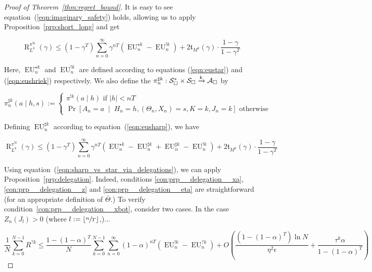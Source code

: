 \documentclass[anon,12pt]{colt2018} %
\newcommand{\Comment}[1]{}
\newcommand{\AP}[1]{\left(#1\right)}
\newcommand{\ABM}[2]{\left[#1\;\middle\vert\;#2\right]}
\newcommand{\CP}[3]{\underset{#1}{\operatorname{Pr}}\ABM{#2}{#3}}
\newcommand{\Reals}{\mathbb{R}}
\newcommand{\Abs}[1]{\left\vert #1 \right\vert}
\newcommand{\Floor}[1]{\left\lfloor #1 \right\rfloor}
\newcommand{\K}{\xrightarrow{\textnormal{k}}}
\newcommand{\A}{\mathcal{A}}
\newcommand{\St}{\mathcal{S}}
\newcommand{\EU}{\operatorname{EU}}
\newcommand{\Rg}{\operatorname{R}}
\newcommand{\Tn}{\mathfrak{t}}
\newcommand{\Ad}{\upsilon}
\newcommand{\PoS}{:\St_\square^* \times \St_\square \K \A_\square}
\newcommand{\IP}{\pi^{!k}}
\begin{document}
\begin{proof}[Proof of Theorem~\ref{thm:regret_bound}]
\Comment{...we define $\alpha_{\Ad\pi}: \St_\square^* \K \St^*$ by

$$\alpha_{\sigma\pi} (g \mid h) := [[h = \underline{g}]]C_h\prod_{n = 0}^{\Abs{h}-1} \sum_{a \in \A}\left([[g_n \in \bot a?]] \pi\left(\bot \mid g_{:n}\right)\sigma\left(a \mid h_{:n}\right)+[[g_n \in a\bot?]]\pi\left(a \mid g_{:n}\right)\right)$$

Here, $C_h \in \Reals$ is a constant defined s.t. the probabilities sum to 1. We define the $?$-policy $\left[\sigma\right]\underline{\pi}$ by

$$\left[\sigma\right]\underline{\pi}(a \mid h):=\Pr_{g \sim \alpha_{\sigma\pi}(h)}\left[\pi\left(g\right)=a \lor \left(\pi\left(g\right)=\bot \land \sigma(h)=a\right)\right]$$}

It is easy to see equation~(\ref{eqn:imaginary_safety}) holds, allowing us to apply Proposition~\ref{prp:short_long} and get

\[\Rg_{L^k}^{\IP}(\gamma) \leq \AP{1-\gamma^T}\sum_{n=0}^\infty \gamma^{nT}\AP{\EU^{\star k}_n-\EU^{!k}_n}+2\Tn_{M^k}(\gamma)\cdot\frac{1-\gamma}{1-\gamma^T}\]

Here, $\EU^{\star k}_n$ and $\EU^{!k}_n$ are defined according to equations (\ref{eqn:eustar}) and (\ref{eqn:eushriek}) respectively. We also define the $\pi^{\sharp k}_n\PoS$ by

$$\pi^{\sharp k}_n(a \mid h,s):=\begin{cases} \pi^{!k}(a \mid h) \text{ if } \Abs{h} < nT \\ \CP{}{A_n=a}{H_n=h,\AP{\Theta_n,X_n}=s,K=k,J_n=k} \text{ otherwise} \end{cases}$$

Defining $\EU^{\sharp k}_n$ according to equation~(\ref{eqn:eusharp}), we have

\[\Rg_{L^k}^{\IP}(\gamma) \leq \AP{1-\gamma^T}\sum_{n=0}^\infty \gamma^{nT}\AP{\EU^{\star k}_n-\EU^{\sharp k}_n+\EU^{\sharp k}_n-\EU^{!k}_n}+2\Tn_{M^k}(\gamma)\cdot\frac{1-\gamma}{1-\gamma^T}\]

Using equation~(\ref{eqn:sharp_vs_star_via_delegations}), we can apply Proposition~\ref{prp:delegation}. Indeed, conditions \ref{con:prp__delegation__xa}, \ref{con:prp__delegation__z} and \ref{con:prp__delegation__eta} are straightforward (for an appropriate definition of $\bar{\Theta}$.) To verify condition~\ref{con:prp__delegation__xbot}, consider two cases. In the case $Z_n\AP{J_l} > 0$ (where $l:=\Floor{\sfrac{n}{T}}$,)...

$$\frac{1}{N}\sum_{k=0}^{N-1}R^{?k} \leq\frac{1-(1-\alpha)^T}{N}\sum_{k=0}^{N-1}\sum_{n=0}^\infty (1-\alpha)^{nT} \left(\EU^{!k}_n-\EU^{?k}_n\right) + O\AP{\frac{\AP{1-(1-\alpha)^T}\ln N}{\eta^2\epsilon}+\frac{\tau^k\alpha}{1-(1-\alpha)^T}}$$


\end{proof}
\end{document}
